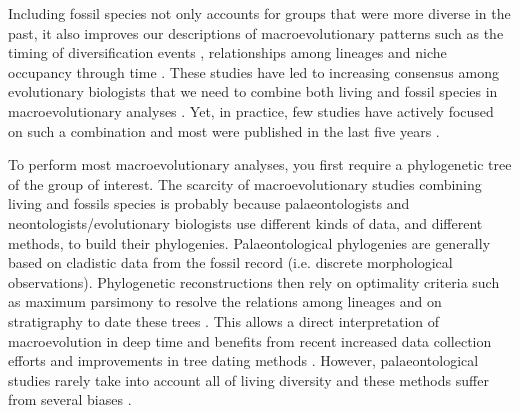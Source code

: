 Including fossil species not only accounts for groups that were more diverse in the past, it also improves our descriptions of macroevolutionary patterns such as the timing of diversification events \citep[e.g. significantly reducing node age confidence intervals;][]{ronquista2012}, relationships among lineages \citep[e.g. solving some controversial fossil placement;][]{Dembo2015} %
and niche occupancy through time \citep[e.g.][]{pearmanniche2008}.
These studies have led to increasing %
consensus among evolutionary biologists that we need to combine both living and fossil species in macroevolutionary analyses \citep{jacksonwhat2006,quentaldiversity2010,dietlconservation2011,slaterunifying2013,fritzdiversity2013,benton2015}.
Yet, in practice, few studies have actively focused on such a combination and most were published in the last five years \citep[e.g.][]{ronquista2012,slaterphylogenetic2013,Wood01032013,beckancient2014,Arcila2015131,Dembo2015}. %


To perform most macroevolutionary analyses, you first require a phylogenetic tree of the group of interest. 
The scarcity of macroevolutionary studies combining living and fossils species
is probably because palaeontologists and neontologists/evolutionary biologists use different kinds of data, and different methods, to build their phylogenies.
Palaeontological phylogenies are generally based on cladistic data from the fossil record (i.e. discrete morphological observations).
Phylogenetic reconstructions then rely on optimality criteria such as maximum parsimony \citep{Hennig1966,felsenstein2004} to resolve the relations among lineages and on stratigraphy to date these trees \citep{GoloboffTNT}.
This allows a direct interpretation of macroevolution in deep time and benefits from recent increased data collection efforts \citep[e.g. 4541 characters in][introducing the term ``phenomics'']{O'Leary08022013} and improvements in tree dating methods \citep[e.g. the \textit{cal3} method from][]{Bapst2014}.
However, palaeontological studies rarely take into account all of living diversity \citep[e.g. only 38 out of 351 living primates are included with 119 fossils in][]{ni2013oldest} and these methods suffer from several biases \citep[e.g. parsimony;][]{wrightbayesian2014}.

